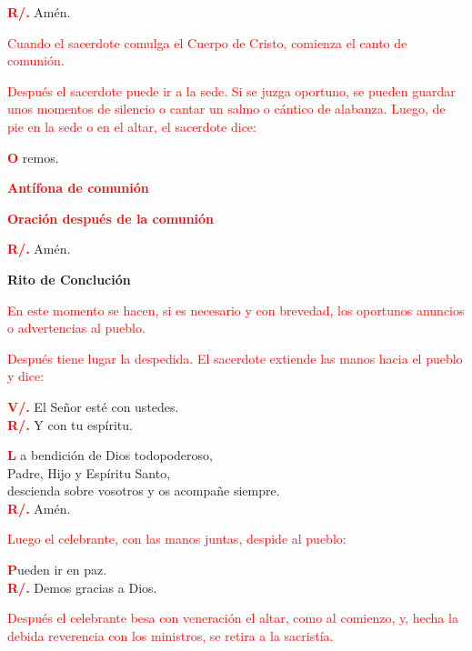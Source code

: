 \documentclass[12pt, letterpaper]{report}
\begin{document}
\noindent
\Large {\bfseries \textcolor{red}{R/.}} \hspace{0.5cm} Am\'en.

\large{\textcolor{red}{Cuando el sacerdote comulga el Cuerpo de Cristo, comienza el canto de comuni\'on.}}

\large{\textcolor{red}{Despu\'es el sacerdote puede ir a la sede. Si se juzga oportuno, se pueden guardar unos momentos de silencio o cantar un salmo o c\'antico de alabanza. Luego, de pie en la sede o en el altar, el sacerdote dice:}}

\lettrine[lines=1]{\bfseries \textcolor{red}{O}}{} \Large remos.

\Large {\bfseries \textcolor{red}{Ant\'ifona de comuni\'on}}

\Large {\bfseries \textcolor{red}{Oraci\'on despu\'es de la comuni\'on}}

\noindent
\Large {\bfseries \textcolor{red}{R/.}} \hspace{0.5cm} Am\'en.

\newpage
\large {\bfseries \textcolor{red}{}}
\begin{center}
\Huge {\bfseries Rito de Concluci\'on}
\end{center}

\large{\textcolor{red}{En este momento se hacen, si es necesario y con brevedad, los oportunos anuncios o advertencias al pueblo.}}

\large{\textcolor{red}{Despu\'es tiene lugar la despedida. El sacerdote extiende las manos hacia el pueblo y dice:}}

\noindent
\Large {\bfseries \textcolor{red}{V/.}} \hspace{0.5cm} El Se\~nor est\'e con ustedes.\\
\noindent
\Large {\bfseries \textcolor{red}{R/.}} \hspace{0.5cm} Y con tu esp\'iritu.

\lettrine[lines=2]{\bfseries \textcolor{red}{L}}{} \Large a bendici\'on de Dios todopoderoso, \\
Padre, Hijo \Huge{\textcolor{red}{}} \Large y Esp\'iritu Santo, \\
descienda sobre vosotros y os acompa\~ne siempre.\\
\noindent
\Large {\bfseries \textcolor{red}{R/.}} \hspace{0.5cm} Am\'en.

\large{\textcolor{red}{Luego el celebrante, con las manos juntas, despide al pueblo:}}

\lettrine[lines=1]{\bfseries \textcolor{red}{P}}{}\Large ueden ir en paz.\\
\noindent
\Large {\bfseries \textcolor{red}{R/.}} \hspace{0.5cm} Demos gracias a Dios.

\large{\textcolor{red}{Despu\'es el celebrante besa con veneraci\'on el altar, como al comienzo, y, hecha la debida reverencia con los ministros, se retira a la sacrist\'ia.}}

\end{document}
